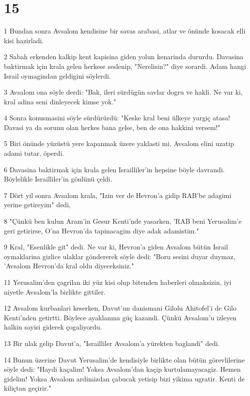 \chapter{15}

\par 1 Bundan sonra Avsalom kendisine bir savas arabasi, atlar ve önünde kosacak elli kisi hazirladi.
\par 2 Sabah erkenden kalkip kent kapisina giden yolun kenarinda dururdu. Davasina baktirmak için krala gelen herkese seslenip, "Nerelisin?" diye sorardi. Adam hangi Israil oymagindan geldigini söylerdi.
\par 3 Avsalom ona söyle derdi: "Bak, ileri sürdügün savlar dogru ve hakli. Ne var ki, kral adina seni dinleyecek kimse yok."
\par 4 Sonra konusmasini söyle sürdürürdü: "Keske kral beni ülkeye yargiç atasa! Davasi ya da sorunu olan herkes bana gelse, ben de ona hakkini versem!"
\par 5 Biri önünde yüzüstü yere kapanmak üzere yaklasti mi, Avsalom elini uzatip adami tutar, öperdi.
\par 6 Davasina baktirmak için krala gelen Israilliler'in hepsine böyle davrandi. Böylelikle Israilliler'in gönlünü çeldi.
\par 7 Dört yil sonra Avsalom krala, "Izin ver de Hevron'a gidip RAB'be adagimi yerine getireyim" dedi,
\par 8 "Çünkü ben kulun Aram'in Gesur Kenti'nde yasarken, 'RAB beni Yerusalim'e geri getirirse, O'na Hevron'da tapinacagim diye adak adamistim."
\par 9 Kral, "Esenlikle git" dedi. Ne var ki, Hevron'a giden Avsalom bütün Israil oymaklarina gizlice ulaklar göndererek söyle dedi: "Boru sesini duyar duymaz, 'Avsalom Hevron'da kral oldu diyeceksiniz."
\par 11 Yerusalim'den çagrilan iki yüz kisi olup bitenden haberleri olmaksizin, iyi niyetle Avsalom'la birlikte gittiler.
\par 12 Avsalom kurbanlari keserken, Davut'un danismani Gilolu Ahitofel'i de Gilo Kenti'nden getirtti. Böylece ayaklanma güç kazandi. Çünkü Avsalom'u izleyen halkin sayisi giderek çogaliyordu.
\par 13 Bir ulak gelip Davut'a, "Israilliler Avsalom'a yürekten baglandi" dedi.
\par 14 Bunun üzerine Davut Yerusalim'de kendisiyle birlikte olan bütün görevlilerine söyle dedi: "Haydi kaçalim! Yoksa Avsalom'dan kaçip kurtulamayacagiz. Hemen gidelim! Yoksa Avsalom ardimizdan çabucak yetisip bizi yikima ugratir. Kenti de kiliçtan geçirir."
